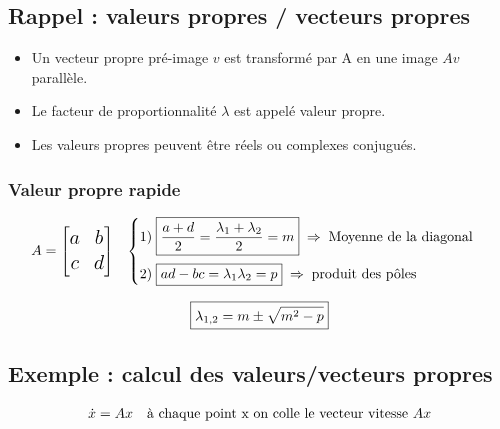\documentclass[document.tex]{subfiles}
\begin{document}
\subsection{Rappel : valeurs propres / vecteurs propres}


\begin{itemize}
\item Un vecteur propre pré-image $v$ est transformé par A en une image $Av$ parallèle.
\item Le facteur de proportionnalité $\lambda$ est appelé valeur propre.
\item Les valeurs propres peuvent être réels ou complexes conjugués.
\end{itemize}

\subsubsection{Valeur propre rapide}

\begin{equation}
\begin{array}{l l}
	\begin{Large} A = \begin{bmatrix} a & b \\ c & d \end{bmatrix} \end{Large} & \begin{cases} \text{1)}\; \boxed{\frac{a+d}{2} = \frac{\lambda_1+\lambda_2}{2} = m} \; \Rightarrow \; \text{Moyenne de la diagonal} \\[12pt] \text{2)}\; \boxed{ad-bc=\lambda_1 \lambda_2 = p} \; \Rightarrow \; \text{produit des pôles} \end{cases}
\end{array}
\end{equation}

\begin{equation}
\boxed{\begin{Large} \lambda_{1,2} = m \pm \sqrt{m^2-p} \end{Large}}
\end{equation}

\subsection{Exemple : calcul des valeurs/vecteurs propres}

\begin{equation}
\begin{array}{l l}
\dot{x}=Ax & \text{à chaque point x on colle le vecteur vitesse  } Ax
\end{array}
\end{equation}
\end{document}
